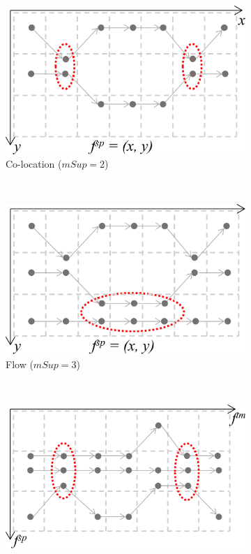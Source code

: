 \documentclass[preprint,12pt,authoryear]{elsarticle} %
\begin{document}
\begin{figure}[t]
    \begin{subfigure}[t]{.5\columnwidth}
        \centering
        \includegraphics[scale=.18]{colocation.pdf}
        \caption{Co-location ($mSup=2$)}
        \label{fig:colocation}
    \end{subfigure}~
    \begin{subfigure}[t]{.5\columnwidth}
        \centering
        \includegraphics[scale=.18]{flow.pdf}
        \caption{Flow ($mSup=3$)}
        \label{fig:flow}
    \end{subfigure}
    \\
    \begin{subfigure}[t]{.53\columnwidth}
        \centering
        \includegraphics[scale=.18]{swarm.pdf}

\end{subfigure}
\end{figure}
\end{document}

